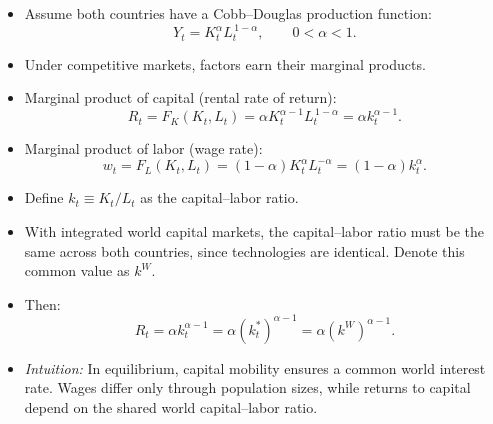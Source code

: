 \documentclass[12pt]{article}
\begin{document}
\begin{itemize}
  \item Assume both countries have a Cobb–Douglas production function:
  \[
  Y_t = K_t^{\alpha} L_t^{\,1-\alpha}, \qquad 0<\alpha<1.
  \]

  \item Under competitive markets, factors earn their marginal products.

  \item Marginal product of capital (rental rate of return):
  \[
  R_t = F_K(K_t,L_t) = \alpha K_t^{\alpha-1} L_t^{\,1-\alpha} 
  = \alpha k_t^{\alpha-1}.
  \]

  \item Marginal product of labor (wage rate):
  \[
  w_t = F_L(K_t,L_t) = (1-\alpha)K_t^{\alpha}L_t^{-\alpha} 
  = (1-\alpha)k_t^{\alpha}. \tag{31}
  \]

  \item Define $k_t \equiv K_t/L_t$ as the capital–labor ratio.

  \item With integrated world capital markets, the capital–labor ratio must be the same across both countries, since technologies are identical. Denote this common value as $k^W$.

  \item Then:
  \[
  R_t = \alpha k_t^{\alpha-1} = \alpha (k_t^*)^{\alpha-1} = \alpha (k^W)^{\alpha-1}. \tag{32}
  \]

  \item \textit{Intuition:} In equilibrium, capital mobility ensures a common world interest rate. Wages differ only through population sizes, while returns to capital depend on the shared world capital–labor ratio.
\end{itemize}
\end{document}
